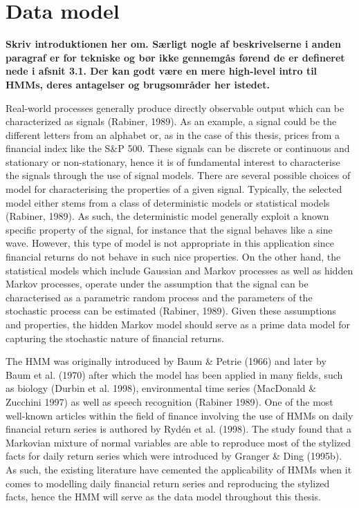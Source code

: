 \newpage
 \section{Data model}
 
 \textbf{Skriv introduktionen her om. Særligt nogle af beskrivelserne i anden paragraf er for tekniske og bør ikke gennemgås førend de er defineret nede i afsnit 3.1. Der kan godt være en mere high-level intro til HMMs, deres antagelser og brugsområder her istedet.}
 
Real-world processes generally produce directly observable output which can be characterized as signals (Rabiner, 1989). As an example, a signal could be the different letters from an alphabet or, as in the case of this thesis, prices from a financial index like the S\&P 500. These signals can be discrete or continuous and stationary or non-stationary, hence it is of fundamental interest to characterise the signals through the use of signal models. There are several possible choices of model for characterising the properties of a given signal. Typically, the selected model either stems from a class of deterministic models or statistical models (Rabiner, 1989). As such, the deterministic model generally exploit a known specific property of the signal, for instance that the signal behaves like a sine wave. However, this type of model is not appropriate in this application since financial returns do not behave in such nice properties. On the other hand, the statistical models which include Gaussian and Markov processes as well as hidden Markov processes, operate under the assumption that the signal can be characterised as a parametric random process and the parameters of the stochastic process can be estimated (Rabiner, 1989). Given these assumptions and properties, the hidden Markov model should serve as a prime data model for capturing the stochastic nature of financial returns.

The HMM was originally introduced by Baum \& Petrie (1966) and later by Baum et al. (1970) after which the model has been applied in many fields, such as biology (Durbin et al. 1998), environmental time series (MacDonald \& Zucchini 1997) as well as speech recognition (Rabiner 1989). One of the most well-known articles within the field of finance involving the use of HMMs on daily financial return series is authored by Rydén et al. (1998). The study found that a  Markovian mixture of normal variables are able to reproduce most of the stylized facts for daily return series which were introduced by Granger \& Ding (1995b). As such, the existing literature have cemented the applicability of HMMs when it comes to modelling daily financial return series and reproducing the stylized facts, hence the HMM will serve as the data model throughout this thesis.

